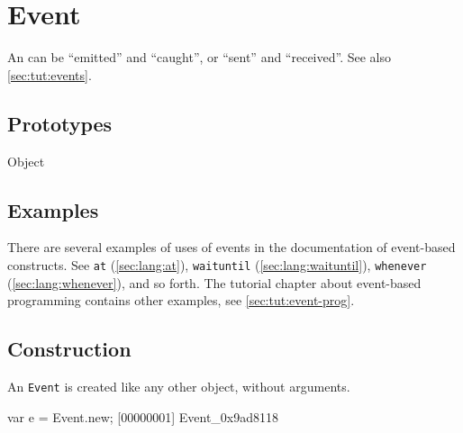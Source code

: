 \section{Event}

An  can be ``emitted'' and ``caught'', or ``sent'' and
``received''.  See also \autoref{sec:tut:events}.

\subsection{Prototypes}
\begin{refObjects}
\item[Object]
\end{refObjects}

\subsection{Examples}

There are several examples of uses of events in the documentation of
event-based constructs.  See \lstinline{at} (\autoref{sec:lang:at}),
\lstinline{waituntil} (\autoref{sec:lang:waituntil}),
\lstinline{whenever} (\autoref{sec:lang:whenever}), and so forth.  The
tutorial chapter about event-based programming contains other
examples, see \autoref{sec:tut:event-prog}.

\subsection{Construction}

An \lstinline{Event} is created like any other object, without
arguments.

\begin{urbiscript}[firstnumber=1]
var e = Event.new;
[00000001] Event_0x9ad8118
\end{urbiscript}

